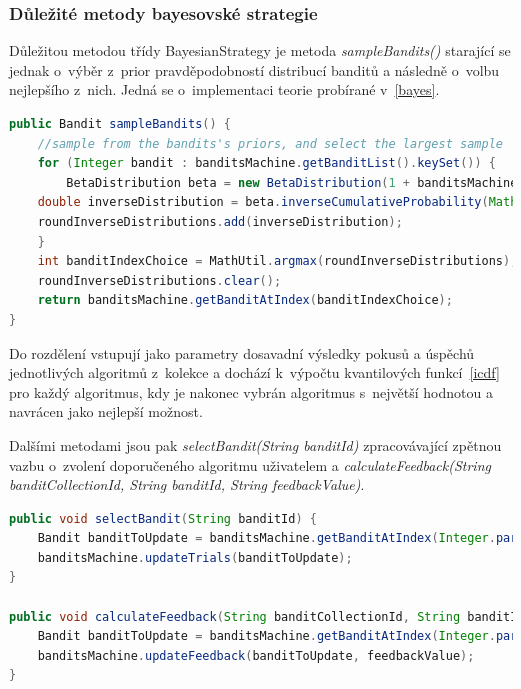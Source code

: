 \documentclass[thesis=M,czech]{FITthesis}[2014/05/07]
\begin{document}
\subsubsection{Důležité metody bayesovské strategie}
	Důležitou metodou třídy BayesianStrategy je metoda \emph{sampleBandits()} starající se jednak o~výběr z~prior pravděpodobností distribucí banditů a následně o~volbu nejlepšího z~nich. Jedná se o~implementaci teorie probírané v~\ref{bayes}.
	
\begin{lstlisting}[language=java]
public Bandit sampleBandits() {
    //sample from the bandits's priors, and select the largest sample
    for (Integer bandit : banditsMachine.getBanditList().keySet()) {
        BetaDistribution beta = new BetaDistribution(1 + banditsMachine.getBanditAtIndex(bandit).getSuccesses(), 1 + banditsMachine.getBanditAtIndex(bandit).getTrials() - banditsMachine.getBanditAtIndex(bandit).getSuccesses());
    double inverseDistribution = beta.inverseCumulativeProbability(Math.random());
    roundInverseDistributions.add(inverseDistribution);
    }
    int banditIndexChoice = MathUtil.argmax(roundInverseDistributions);
    roundInverseDistributions.clear();
    return banditsMachine.getBanditAtIndex(banditIndexChoice);
}
\end{lstlisting}	

Do rozdělení vstupují jako parametry dosavadní výsledky pokusů a úspěchů jednotlivých algoritmů z~kolekce a dochází k~výpočtu kvantilových funkcí~\ref{icdf} pro každý algoritmus, kdy je nakonec vybrán algoritmus s~největší hodnotou a navrácen jako nejlepší možnost. 

Dalšími metodami jsou pak \emph{selectBandit(String banditId)} zpracovávající zpětnou vazbu o~zvolení doporučeného algoritmu uživatelem a \emph{calculateFeedback(String banditCollectionId, String banditId, String feedbackValue)}. 

\begin{lstlisting}[language=java]
public void selectBandit(String banditId) {
    Bandit banditToUpdate = banditsMachine.getBanditAtIndex(Integer.parseInt(banditId));        
    banditsMachine.updateTrials(banditToUpdate);           
}

public void calculateFeedback(String banditCollectionId, String banditId, String feedbackValue) {
    Bandit banditToUpdate = banditsMachine.getBanditAtIndex(Integer.parseInt(banditId));
    banditsMachine.updateFeedback(banditToUpdate, feedbackValue);   
}  
\end{lstlisting}	
\end{document}
